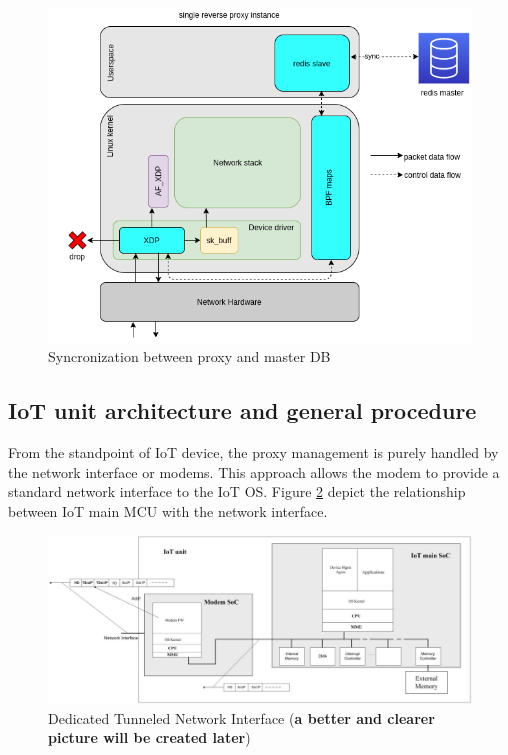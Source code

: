 \documentclass[sigplan,screen]{acmart}
\begin{document}
\begin{figure}[htbp]
\centerline{\includegraphics[scale=0.35]{pic/proxies_xdp.png}}
\caption{Syncronization between proxy and master DB}
\label{proxies_xdp}
\end{figure}

\subsection{IoT unit architecture and general procedure}
From the standpoint of IoT device, the proxy management is purely handled by the network interface or modems. This approach allows the modem to provide a standard network interface to the IoT OS. Figure \ref{iot_network} depict the relationship between IoT main MCU with the network interface. 

\begin{figure}[htbp]
\centerline{\includegraphics[scale=0.17]{pic/iot.png}}
\caption{Dedicated Tunneled Network Interface (\textbf{a better and clearer picture will be created later})}
\label{iot_network}
\end{figure}
\end{document}

